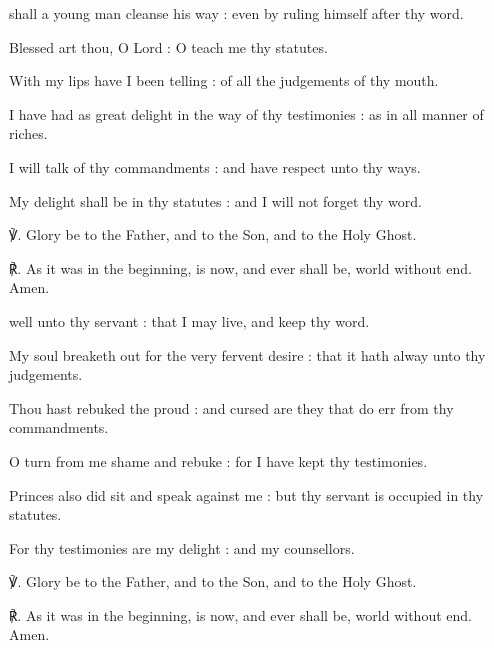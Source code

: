 \begin{multicols}{2}
 shall a young man cleanse his way : even by ruling himself after thy word.\par
{}
Blessed art thou, O Lord : O teach me thy statutes.\par
{}With my lips have I been telling : of all the judgements of thy mouth.\par
{}I have had as great delight in the way of thy testimonies : as in all manner of riches.\par
{}I will talk of thy commandments : and have respect unto thy ways.\par
{}My delight shall be in thy statutes : and I will not forget thy word.\par
℣. Glory be to the Father, and to the Son, and to the Holy Ghost.\par
℟. As it was in the beginning, is now, and ever shall be, world without end. Amen.

 well unto thy servant : that I may live, and keep thy word.\par
{}
My soul breaketh out for the very fervent desire : that it hath alway unto thy judgements.\par
{}Thou hast rebuked the proud : and cursed are they that do err from thy commandments.\par
{}O turn from me shame and rebuke : for I have kept thy testimonies.\par
{}Princes also did sit and speak against me : but thy servant is occupied in thy statutes.\par
{}For thy testimonies are my delight : and my counsellors.\par
℣. Glory be to the Father, and to the Son, and to the Holy Ghost.\par
℟. As it was in the beginning, is now, and ever shall be, world without end. Amen.


\end{multicols}

